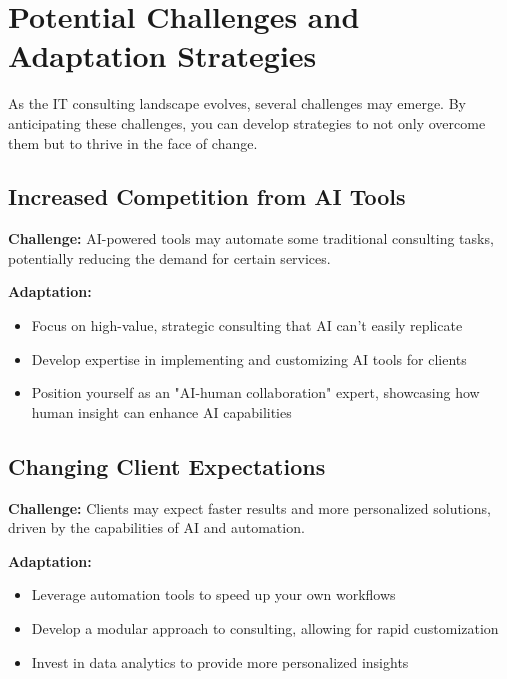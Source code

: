 

\section{Potential Challenges and Adaptation Strategies}

As the IT consulting landscape evolves, several challenges may emerge. By anticipating these challenges, you can develop strategies to not only overcome them but to thrive in the face of change.

\subsection{Increased Competition from AI Tools}

\textbf{Challenge:} AI-powered tools may automate some traditional consulting tasks, potentially reducing the demand for certain services.

\textbf{Adaptation:}
\begin{itemize}
    \item Focus on high-value, strategic consulting that AI can't easily replicate
    \item Develop expertise in implementing and customizing AI tools for clients
    \item Position yourself as an "AI-human collaboration" expert, showcasing how human insight can enhance AI capabilities
\end{itemize}

\subsection{Changing Client Expectations}

\textbf{Challenge:} Clients may expect faster results and more personalized solutions, driven by the capabilities of AI and automation.

\textbf{Adaptation:}
\begin{itemize}
    \item Leverage automation tools to speed up your own workflows
    \item Develop a modular approach to consulting, allowing for rapid customization
    \item Invest in data analytics to provide more personalized insights
\end{itemize}

